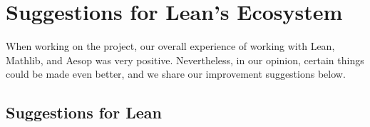 \section{Suggestions for Lean's Ecosystem}

When working on the project, our overall experience of working with Lean, Mathlib, and Aesop was very positive. Nevertheless, in our opinion, certain things could be made even better, and we share our improvement suggestions below.

\subsection{Suggestions for Lean}


